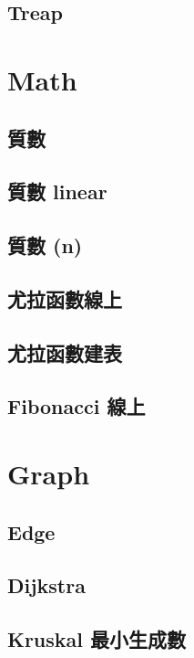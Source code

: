\subsection{Treap}


\section{Math}
\subsection{質數}

\subsection{質數 linear}

\subsection{質數 (n)}

\subsection{尤拉函數線上}

\subsection{尤拉函數建表}

\subsection{Fibonacci 線上}


\section{Graph}
\subsection{Edge}

\subsection{Dijkstra}

\subsection{Kruskal 最小生成數}


